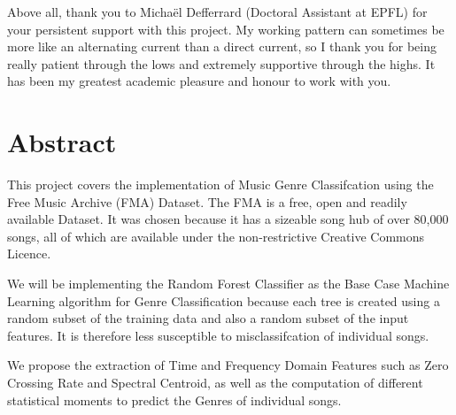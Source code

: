 \documentclass[11pt]{article}
\begin{document}
\noindent 
Above all, thank you to Micha\"el Defferrard (Doctoral Assistant at EPFL) for your persistent support with this project.  My working pattern can sometimes be more like an alternating current than a direct current, so I thank you for being really patient through the lows and extremely supportive through the highs. It has been my greatest academic pleasure and honour to work with you. 

\newpage


\section*{Abstract}

This project covers the implementation of Music Genre Classifcation using the Free Music Archive (FMA) Dataset. 
The FMA is a free, open and readily available Dataset. It was chosen because it has a sizeable song hub of over 80,000 songs, all of which are available under the non-restrictive Creative Commons Licence.  



\noindent 
\newline
We will be implementing the Random Forest Classifier as the Base Case Machine Learning algorithm for Genre Classification because each tree is created using a random subset of the training data and also a random subset of the input features. It is therefore less susceptible to misclassifcation of individual songs.


\noindent 
\newline
We propose the extraction of Time and Frequency Domain Features such as Zero Crossing Rate and Spectral Centroid, as well as the computation of different statistical moments to predict the Genres of individual songs. 



\clearpage

\newpage



\listoffigures 
\newpage



\tableofcontents

\newpage


\end{document}
